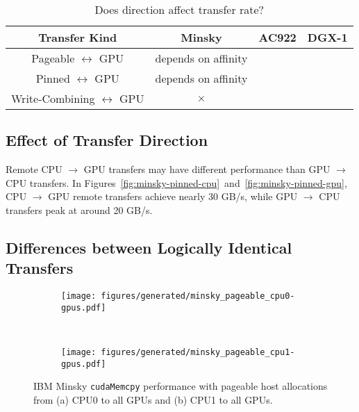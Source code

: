 \begin{table}[ht]
    \centering
    \caption[Matrix: Transfer rate affected by direction]{Does direction affect transfer rate?}
    \label{tab:explicit}
    \begin{tabular}{|c|c|c|c|}
    \hline
    \textbf{Transfer Kind} & \textbf{Minsky} & \textbf{AC922} & \textbf{DGX-1} \\ \hline 
    Pageable $\leftrightarrow$ GPU        & depends on affinity & & \\ \hline
    Pinned $\leftrightarrow$ GPU          & depends on affinity & & \\ \hline
    Write-Combining $\leftrightarrow$ GPU & $\times$ & & \\ \hline
    \end{tabular}
\end{table}

\subsection{Effect of Transfer Direction}

Remote CPU $\rightarrow$ GPU transfers may have different performance than GPU $\rightarrow$ CPU transfers.
        In Figures~\ref{fig:minsky-pinned-cpu}~and~\ref{fig:minsky-pinned-gpu}, CPU $\rightarrow$ GPU remote transfers achieve nearly 30 GB/s, while GPU $\rightarrow$ CPU transfers peak at around 20 GB/s.

\subsection{Differences between Logically Identical Transfers}

\begin{figure}[ht]
    \centering
    \begin{subfigure}[b]{0.45\textwidth}
        \texttt{[image: figures/generated/minsky\_pageable\_cpu0-gpus.pdf]}
        \caption{}
        \label{fig:}
    \end{subfigure}
    ~
    \begin{subfigure}[b]{0.45\textwidth}
        \texttt{[image: figures/generated/minsky\_pageable\_cpu1-gpus.pdf]}
        \caption{}
        \label{fig:}
    \end{subfigure}
    \caption[]{
        IBM Minsky \texttt{cudaMemcpy} performance with pageable host allocations from (a) CPU0 to all GPUs and (b) CPU1 to all GPUs.
    }
    \label{fig:topo-asymmetry}
\end{figure}

